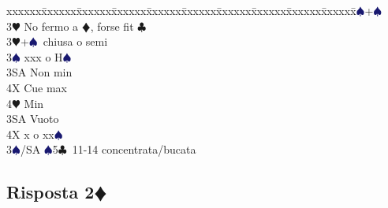 \documentclass[a4paper,italian]{article}
\newcommand{\BC}{\textcolor{OliveGreen}{$\clubsuit$}}
\newcommand{\BD}{\textcolor{RedOrange}{$\vardiamondsuit$}}
\newcommand{\BH}{\textcolor{Red2}{$\varheartsuit${}}}
\newcommand{\BS}{\textcolor{MidnightBlue}{$\spadesuit${}}}
\newcommand{\pdfd}{\texorpdfstring{\BD{}}{D}}
\newenvironment{bidtable}
{\begin{tabbing}

    xxxxxx\=xxxxxx\=xxxxxx\=xxxxxx\=xxxxxx\=xxxxxx\=xxxxxx\=xxxxxx\=xxxxxx\=xxxxxx\=\kill}
{\end{tabbing} }%
\begin{document}
\begin{multicols}{2}
\begin{bidtable}
                                            3\BS {}+\BS \\
                                            3\BH \> No fermo a \BD , forse fit \BC \-\\
                                            3\BH {}+\BS\ chiusa o semi\+\\
                                            3\BS \> xxx o H\BS \+\\
                                            3SA \> Non min\\
                                            4X \> Cue max\\
                                            4\BH \> Min\-\\
                                            3SA \> Vuoto\\
                                            4X \> x o xx\BS \-\\
                                            3\BS/SA \BS 5\BC\ 11-14 concentrata/bucata
                                        \end{bidtable}
                                    \end{multicols}
                                    \newpage
                                    \subsection{Risposta 2\pdfd}
\end{document}
